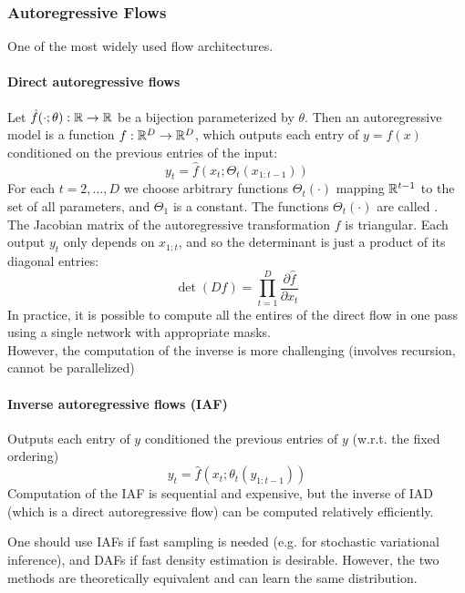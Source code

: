 \documentclass[11pt]{article}
\begin{document}
\subsubsection{Autoregressive Flows}
One of the most widely used flow architectures.\\
\paragraph{Direct autoregressive flows}
Let $\hat{f}(\cdot;\theta): \mathbb{R} \rightarrow \mathbb{R}$ be a bijection parameterized by $\theta$. Then an autoregressive model is a function $f: \mathbb{R}^D \rightarrow \mathbb{R}^D$, which outputs each entry of $y = f(x)$ conditioned on the previous entries of the input:
$$y_t = \hat{f}(x_t; \Theta_t(x_{1:t-1}))$$
For each $t = 2, \hdots, D$ we choose arbitrary functions $\Theta_t(\cdot)$ mapping $\mathbb{R}^{t-1}$ to the set of all parameters, and $\Theta_1$ is a constant. The functions $\Theta_t(\cdot)$ are called . \\
The Jacobian matrix of the autoregressive transformation $f$ is triangular. Each output $y_t$ only depends on $x_{1:t}$, and so the determinant is just a product of its diagonal entries:
$$\det(Df) = \prod_{t=1}^D \frac{\partial \hat{f}}{\partial x_t}$$
In practice, it is possible to compute all the entires of the direct flow in one pass using a single network with appropriate masks.\\
However, the computation of the inverse is more challenging (involves recursion, cannot be parallelized)

\paragraph{Inverse autoregressive flows (IAF)}
Outputs each entry of $y$ conditioned the previous entries of $y$ (w.r.t. the fixed ordering)
$$y_t = \hat{f}(x_t;\theta_t(y_{1:t-1}))$$
Computation of the IAF is sequential and expensive, but the inverse of IAD (which is a direct autoregressive flow) can be computed relatively efficiently.

\remark
One should use IAFs if fast sampling is needed (e.g. for stochastic variational inference), and DAFs if fast density estimation is desirable. However, the two methods are theoretically equivalent and can learn the same distribution.
\end{document}
